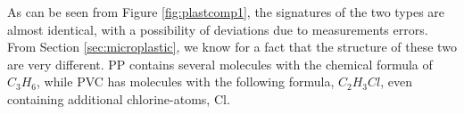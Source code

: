 \noindent
As can be seen from Figure \ref{fig:plastcomp1}, the signatures of the two types are almost identical, with a possibility of deviations due to measurements errors. From Section \ref{sec:microplastic}, we know for a fact that the structure of these two are very different. PP contains several molecules with the chemical formula of $C_3H_6$, while PVC has molecules with the following formula, $C_2H_3Cl$, even containing additional chlorine-atoms, Cl.  
\\\\
